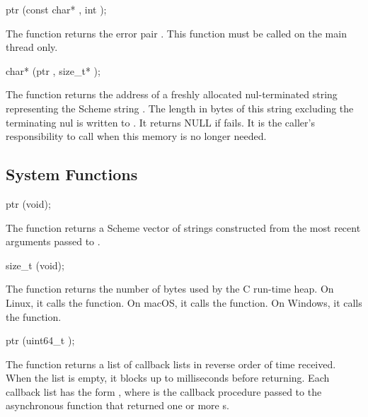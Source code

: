 \begin{function}
  ptr (const char* , int );
\end{function}

The  function returns the error pair
. This function must be called on the
main thread only.

\begin{function}
  char* (ptr , size\_t* );
\end{function}

The  function returns the address of a
freshly allocated nul-terminated string representing the Scheme string
. The length in bytes of this string excluding the terminating
nul is written to . It returns NULL if
 fails. It is the caller's responsibility to call
 when this memory is no longer needed.

\subsection {System Functions}

\begin{function}
  ptr (void);
\end{function}

The  function returns a Scheme vector of strings
constructed from the most recent arguments passed to
.

\begin{function}
  size\_t (void);
\end{function}

The  function returns the number of bytes
used by the C run-time heap. On Linux, it calls the 
function. On macOS, it calls the  function. On Windows,
it calls the  function.

\begin{function}
  ptr (uint64\_t );
\end{function}

The  function returns a list of callback
lists in reverse order of time received. When the list is empty, it
blocks up to  milliseconds before returning. Each
callback list has the form ,
where  is the callback procedure passed to the
asynchronous function that returned one or more s.

